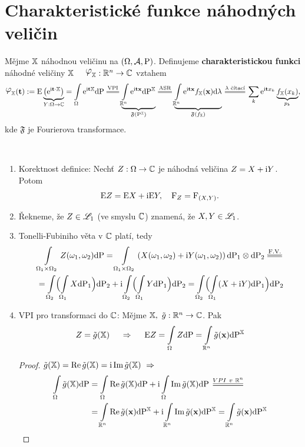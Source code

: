 \section{Charakteristické funkce náhodných veličin}
\begin{define}
	Mějme $\mathbb{X}$ náhodnou veličinu na $(\Omega,\mathcal{A},\mathrm{P})$. Definujeme \textbf{charakteristickou funkci} náhodné veličiny $\mathbb{X}$~~ $\lphi_\X:\R^n\to\C $ vztahem $$\lphi_\X(\textbf{t}):= \E \underbrace{\bigl( \me^{\mi\textbf{t}\cdot \X} \bigr)}_{Y:\Omega\to \C}=\int\limits_{\Omega} \me^{\mi\textbf{t}\X}\dif \PP\equal{\text{VPI}}\underbrace{\int\limits_{\R^n}\me^{\mi\textbf{t}\textbf{x}}\dif\PEX}_{\mathfrak{F}(\PEX)}\equal{\text{ASR}}\underbrace{\int\limits_{\R^n}\me^{\mi\textbf{t}\textbf{x}}\fex(\textbf{x})\dif\lambda}_{\mathfrak{F}(\fex)}\equal{\lambda\text{ čítací}}\sum\limits_{k}\me^{\mi\textbf{t}x_k}\underbrace{\fex(x_k)}_{p_k},$$ kde $\mathfrak{F}$ je Fourierova transformace.
\end{define}
\begin{remark}~
	\begin{enumerate}
		\item Korektnost definice: Nechť $Z:\Omega\to\mathbb{C}$ je náhodná veličina $Z=X+ \mathrm{i}  Y$. Potom 
		$$ \mathrm{E} Z=\mathrm{E} X+ \mathrm{i}  \mathrm{E} Y,~~~\mathrm{F}_Z=\mathrm{F}_{(X,Y)}. $$
		\item Řekneme, že $Z\in\mathscr{L}_1$ (ve smyslu $\mathbb{C}$) znamená, že $X,Y\in\mathscr{L}_1$. 
		\item Tonelli-Fubiniho věta v $\mathbb{C}$ platí, tedy
		\[
		\begin{split}
		&\int\limits_{\Omega_1\times\Omega_2} Z(\omega_1,\omega_2)\dif \PP=\int\limits_{\Omega_1\times\Omega_2}\left( X(\omega_1,\omega_2)+ \mi  Y(\omega_1,\omega_2) \right)\dif \PP_1\otimes \dif \PP_2\equal{\text{F.V.}} \\ 
		&=\int\limits_{\Omega_2}\Bigl( \int\limits_{\Omega_1} X\dif \PP_1 \Bigr)\dif \PP_2+\mi \int\limits_{\Omega_2}\Bigl( \int\limits_{\Omega_1} Y\dif \PP_1 \Bigr)\dif \PP_2=\int\limits_{\Omega_2} \Bigl( \int\limits_{\Omega_1}(X+\mi Y)\dif \PP_1 \Bigr)\dif \PP_2 
		\end{split}
		\] 
		\item VPI pro transformaci do $\mathbb{C}$: Mějme $\mathbb{X},~\tilde{g}:\mathbb{R}^n\to\mathbb{C}$. Pak
		$$ Z=\tilde{g}(\mathbb{X})~~~~\Rightarrow~~~~\mathrm{E} Z=\int\limits_{\Omega}Z\mathrm{d} \mathrm{P}=\int\limits_{\mathbb{R}^n}\tilde{g}(\textbf{x})\mathrm{d}\mathrm{P}^{\mathbb{X}} $$
		\begin{proof}
			 $\tilde{g}(\mathbb{X})=\mathop{\mathrm{Re}} \tilde{g}(\mathbb{X})= \mathrm{i}  \mathop{\mathrm{Im}} \tilde{g}(\mathbb{X})~\Rightarrow~$
			\[
			\begin{split}
			\int\limits_{\Omega}\tilde{g}(\X)\dif \PP&=\int\limits_{\Omega} \Re \tilde{g}(\X)\dif \PP +  \mi  \int\limits_{\Omega}\Im\tilde{g}(\X)\dif \PP\equal{VPI~v~\R^n} \\
			&= \int\limits_{\R^n}\Re\tilde{g}(\textbf{x})\dif\PEX+ \mi  \int\limits_{\R^n}\Im\tilde{g}(\textbf{x})\dif\PEX=\int\limits_{\R^n}\tilde{g}(\textbf{x})\dif\PEX
			\end{split}
			\] 
		\end{proof}
	\end{enumerate}
\end{remark}

